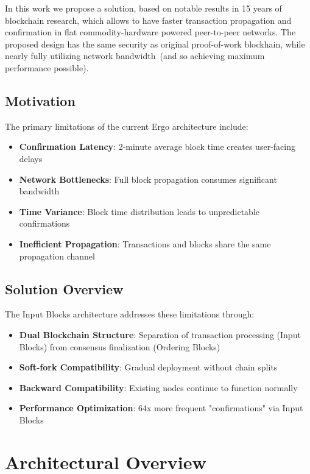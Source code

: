 \documentclass{llncs}
\begin{document}
In this work we propose a solution, based on notable results in 15 years of blockchain research, which allows to have
faster transaction propagation and confirmation in flat commodity-hardware powered peer-to-peer networks. The proposed design
has the same security as original proof-of-work blockhain, while nearly fully utilizing network bandwidth~(and so achieving
maximum performance possible).

\subsection{Motivation}

The primary limitations of the current Ergo architecture include:

\begin{itemize}
\item \textbf{Confirmation Latency}: 2-minute average block time creates user-facing delays
\item \textbf{Network Bottlenecks}: Full block propagation consumes significant bandwidth
\item \textbf{Time Variance}: Block time distribution leads to unpredictable confirmations
\item \textbf{Inefficient Propagation}: Transactions and blocks share the same propagation channel
\end{itemize}

\subsection{Solution Overview}

The Input Blocks architecture addresses these limitations through:

\begin{itemize}
\item \textbf{Dual Blockchain Structure}: Separation of transaction processing (Input Blocks) from consensus finalization (Ordering Blocks)
\item \textbf{Soft-fork Compatibility}: Gradual deployment without chain splits
\item \textbf{Backward Compatibility}: Existing nodes continue to function normally
\item \textbf{Performance Optimization}: 64x more frequent "confirmations" via Input Blocks
\end{itemize}

\section{Architectural Overview}
\end{document}
